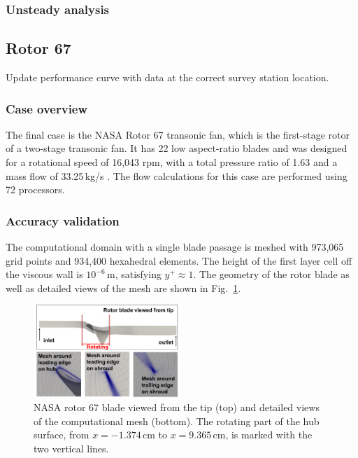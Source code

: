 \documentclass[journal,final]{new-aiaa}
\begin{document}
\subsubsection{Unsteady analysis}

\subsection {Rotor 67}
{\color{red} Update performance curve with data at
the correct survey station location.}

\subsubsection{Case overview}
The final case is the NASA Rotor 67 transonic fan, which
is the first-stage rotor of a two-stage transonic fan.
It has 22 low aspect-ratio blades and was designed for
a rotational speed of 16,043 rpm, with a total pressure ratio
of 1.63 and a mass flow of 33.25\,kg/s \cite{Strazisar1989Laser}.
The flow calculations for this case are performed
using 72 processors.

\subsubsection{Accuracy validation}
The computational domain with a single blade passage is meshed
with 973,065 grid points and 934,400 hexahedral elements. The
height of the first layer cell off the viscous wall is $10^{-6}$\,m,
satisfying $y^+\!\approx\!1$. The geometry of the rotor blade as well as
detailed views of the mesh are shown in Fig.~\ref{rotor67-view}.

\begin{figure}[htb]
	\centering   
	\includegraphics[width=0.5\textwidth]{rotor67/rotor67-geo-mesh.png}
	\caption{NASA rotor 67 blade viewed from the tip (top)
		and detailed views of the computational mesh (bottom). %
		The rotating part of the hub surface, from
		$x=-1.374$\,cm to $x=9.365$\,cm, is marked with the two vertical lines.}	
	\label{rotor67-view} 
\end{figure}
\end{document}
